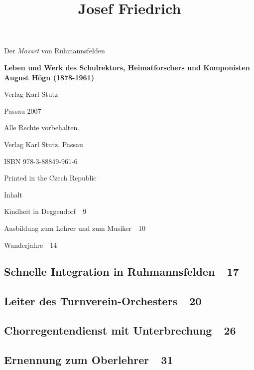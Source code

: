 \documentclass[a4paper]{article}
\title{Josef Friedrich}
\begin{document}
\clearpage{}

{\centering
Der\textit{ Mozart }von Ruhmannsfelden
\par}

{\centering\bfseries
\textmd{Leben und Werk des Schulrektors, Heimatforschers\newline
und Komponisten August Högn (1878-1961)}
\par}

{\centering
Verlag Karl Stutz
\par}

{\centering
Passau 2007
\par}


{\centering
Alle Rechte vorbehalten.
\par}

{\centering
Verlag Karl Stutz, Passau
\par}

{\centering
ISBN 978-3-88849-961-6
\par}

{\centering
Printed in the Czech Republic
\par}

\clearpage
Inhalt

Kindheit in Deggendorf\ \ 9

Ausbildung zum Lehrer und zum Musiker\ \ 10

Wanderjahre\ \ 14

\subsection[Schnelle Integration in Ruhmannsfelden\ \ 17]{Schnelle
Integration in Ruhmannsfelden\ \ 17}
\subsection[Leiter des Turnverein{}-Orchesters\ \ 20]{Leiter des
Turnverein-Orchesters\ \ 20}
\subsection[Chorregentendienst mit
Unterbrechung\ \ 26]{Chorregentendienst mit Unterbrechung\ \ 26}
\subsection[Ernennung zum Oberlehrer\ \ 31]{Ernennung zum
Oberlehrer\ \ 31}
\end{document}
